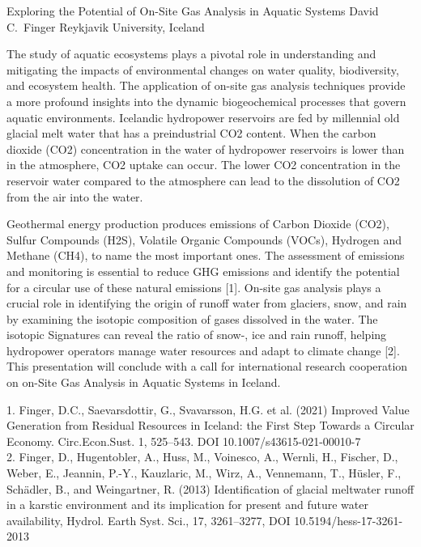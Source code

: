 \begin{conf-abstract}
{Exploring the Potential of On-Site Gas Analysis in Aquatic Systems}
{David C.\ Finger}
{Reykjavik University, Iceland}
{The study of aquatic ecosystems plays a pivotal role in understanding and mitigating the impacts of environmental changes on water quality, biodiversity, and ecosystem health. The application of on-site gas analysis techniques provide a more profound insights into the dynamic biogeochemical processes that govern aquatic environments. 
Icelandic hydropower reservoirs are fed by millennial old glacial melt water that has a preindustrial CO2 content. When the carbon dioxide (CO2) concentration in the water of hydropower reservoirs is lower than in the atmosphere, CO2 uptake can occur. The lower CO2 concentration in the reservoir water compared to the atmosphere can lead to the dissolution of CO2 from the air into the water.

Geothermal energy production produces emissions of Carbon Dioxide (CO2), Sulfur Compounds (H2S), Volatile Organic Compounds (VOCs), Hydrogen and Methane (CH4), to name the most important ones. The assessment of emissions and monitoring is essential to reduce GHG emissions and identify the potential for a circular use of these natural emissions [1]. 
On-site gas analysis plays a crucial role in identifying the origin of runoff water from glaciers, snow, and rain by examining the isotopic composition of gases dissolved in the water. The isotopic Signatures can reveal the ratio of snow-, ice and rain runoff, helping hydropower operators manage water resources and adapt to climate change [2].
This presentation will conclude with a call for international research cooperation on on-Site Gas Analysis in Aquatic Systems in Iceland.

1. Finger, D.C., Saevarsdottir, G., Svavarsson, H.G. et al. (2021) Improved Value Generation from Residual Resources in Iceland: the First Step Towards a Circular Economy. Circ.Econ.Sust. 1, 525–543. DOI 10.1007/s43615-021-00010-7\\
2. Finger, D., Hugentobler, A., Huss, M., Voinesco, A., Wernli, H., Fischer, D., Weber, E., Jeannin, P.-Y., Kauzlaric, M., Wirz, A., Vennemann, T., Hüsler, F., Schädler, B., and Weingartner, R. (2013) Identification of glacial meltwater runoff in a karstic environment and its implication for present and future water availability, Hydrol. Earth Syst. Sci., 17, 3261–3277, DOI 10.5194/hess-17-3261-2013}
\end{conf-abstract}
